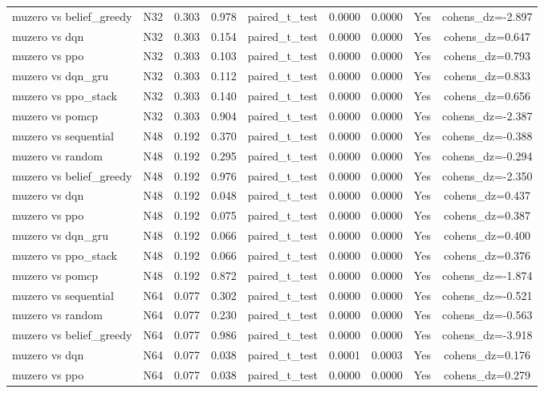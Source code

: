 \begin{table}[htbp]
\begin{tabular}{lcccccccc}
muzero vs belief_greedy & N32 & 0.303 & 0.978 & paired_t_test & 0.0000 & 0.0000 & Yes & cohens_dz=-2.897 \\
muzero vs dqn & N32 & 0.303 & 0.154 & paired_t_test & 0.0000 & 0.0000 & Yes & cohens_dz=0.647 \\
muzero vs ppo & N32 & 0.303 & 0.103 & paired_t_test & 0.0000 & 0.0000 & Yes & cohens_dz=0.793 \\
muzero vs dqn_gru & N32 & 0.303 & 0.112 & paired_t_test & 0.0000 & 0.0000 & Yes & cohens_dz=0.833 \\
muzero vs ppo_stack & N32 & 0.303 & 0.140 & paired_t_test & 0.0000 & 0.0000 & Yes & cohens_dz=0.656 \\
muzero vs pomcp & N32 & 0.303 & 0.904 & paired_t_test & 0.0000 & 0.0000 & Yes & cohens_dz=-2.387 \\
muzero vs sequential & N48 & 0.192 & 0.370 & paired_t_test & 0.0000 & 0.0000 & Yes & cohens_dz=-0.388 \\
muzero vs random & N48 & 0.192 & 0.295 & paired_t_test & 0.0000 & 0.0000 & Yes & cohens_dz=-0.294 \\
muzero vs belief_greedy & N48 & 0.192 & 0.976 & paired_t_test & 0.0000 & 0.0000 & Yes & cohens_dz=-2.350 \\
muzero vs dqn & N48 & 0.192 & 0.048 & paired_t_test & 0.0000 & 0.0000 & Yes & cohens_dz=0.437 \\
muzero vs ppo & N48 & 0.192 & 0.075 & paired_t_test & 0.0000 & 0.0000 & Yes & cohens_dz=0.387 \\
muzero vs dqn_gru & N48 & 0.192 & 0.066 & paired_t_test & 0.0000 & 0.0000 & Yes & cohens_dz=0.400 \\
muzero vs ppo_stack & N48 & 0.192 & 0.066 & paired_t_test & 0.0000 & 0.0000 & Yes & cohens_dz=0.376 \\
muzero vs pomcp & N48 & 0.192 & 0.872 & paired_t_test & 0.0000 & 0.0000 & Yes & cohens_dz=-1.874 \\
muzero vs sequential & N64 & 0.077 & 0.302 & paired_t_test & 0.0000 & 0.0000 & Yes & cohens_dz=-0.521 \\
muzero vs random & N64 & 0.077 & 0.230 & paired_t_test & 0.0000 & 0.0000 & Yes & cohens_dz=-0.563 \\
muzero vs belief_greedy & N64 & 0.077 & 0.986 & paired_t_test & 0.0000 & 0.0000 & Yes & cohens_dz=-3.918 \\
muzero vs dqn & N64 & 0.077 & 0.038 & paired_t_test & 0.0001 & 0.0003 & Yes & cohens_dz=0.176 \\
muzero vs ppo & N64 & 0.077 & 0.038 & paired_t_test & 0.0000 & 0.0000 & Yes & cohens_dz=0.279 \\

\end{tabular}
\end{table}
